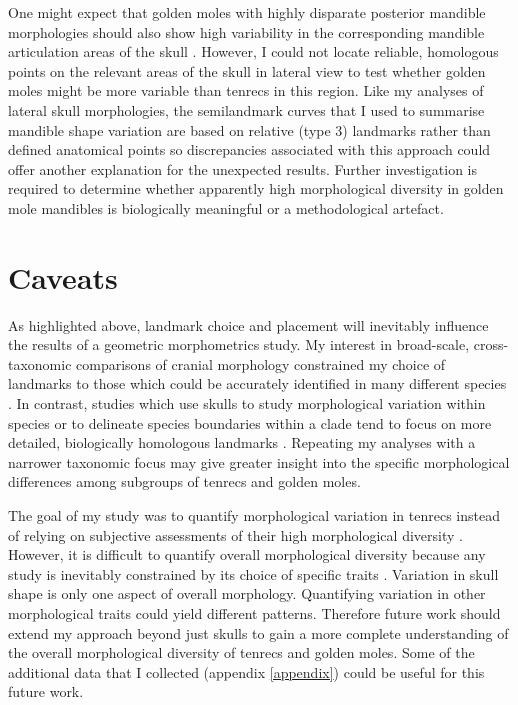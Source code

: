 	One might expect that golden moles with highly disparate posterior mandible morphologies should also show high variability in the corresponding mandible articulation areas of the skull \citep[although developmental genetics studies have revealed that mandibles can also develop shape variation independently of skulls, ][] {Rot-Nikcevic2007}. However, I could not locate reliable, homologous points on the relevant areas of the skull in lateral view to test whether golden moles might be more variable than tenrecs in this region. Like my analyses of lateral skull morphologies, the semilandmark curves that I used to summarise mandible shape variation are based on relative (type 3) landmarks rather than defined anatomical points \citep{Zelditch2012} so discrepancies associated with this approach could offer another explanation for the unexpected results. Further investigation is required to determine whether apparently high morphological diversity in golden mole mandibles is biologically meaningful or a methodological artefact. 

		
\section{Caveats}
\label{sect:caveats}

	As highlighted above, landmark choice and placement will inevitably influence the results of a geometric morphometrics study. My interest in broad-scale, cross-taxonomic comparisons of cranial morphology constrained my choice of landmarks to those which could be accurately identified in many different species \citep[e.g.][]{Ruta2013, Goswami2011, Wroe2007}. In contrast, studies which use skulls to study morphological variation within species \citep{Blagojevic2011, Bornholdt2008} or to delineate species boundaries within a clade \citep[e.g.][]{Panchetti2008} tend to focus on more detailed, biologically homologous landmarks \citep{Zelditch2012}. Repeating my analyses with a narrower taxonomic focus may give greater insight into the specific morphological differences among subgroups of tenrecs and golden moles.
	
	The goal of my study was to quantify morphological variation in tenrecs instead of relying on subjective assessments of their high morphological diversity \citep{Olson2013, Soarimalala2011, Eisenberg1969}. However, it is difficult to quantify overall morphological diversity because any study is inevitably constrained by its choice of specific traits \citep{Roy1997}. Variation in skull shape is only one aspect of overall morphology. Quantifying variation in other morphological traits could yield different patterns. Therefore future work should extend my approach beyond just skulls to gain a more complete understanding of the overall morphological diversity of tenrecs and golden moles. Some of the additional data that I collected (appendix \ref{appendix}) could be useful for this future work.



